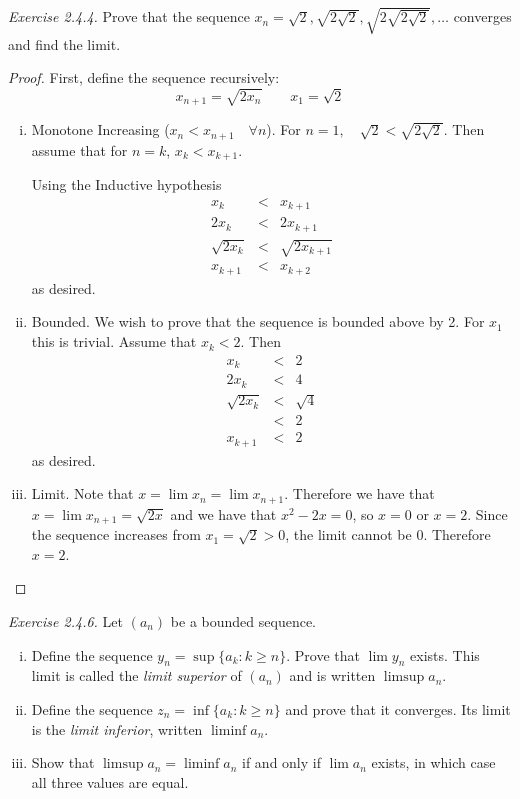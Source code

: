 \emph{Exercise 2.4.4.}  Prove that the sequence $x_n = \sqrt{2}, \sqrt{2\sqrt{2}}, \sqrt{2\sqrt{2\sqrt{2}}}, \ldots$
	converges and find the limit.
	
	\begin{proof}
	First, define the sequence recursively:
	$$  x_{n+1} = \sqrt{2 x_n} \qquad x_1 = \sqrt{2} $$
		\begin{enumerate}[(i)]
		
			\item Monotone Increasing  ($x_{n} < x_{n+1}\quad \forall n$).  For $n=1, \quad \sqrt{2} < \sqrt{2\sqrt{2}}$. Then assume that for $n=k$, $x_k < x_{k+1}$.
			
			Using the Inductive hypothesis
			\begin{eqnarray*}
x_{k}  & <& x_{k+1} \\
   	2x_{k}  &<& 2x_{k+1} \\
    \sqrt{2x_{k}}  &<&\sqrt{ 2 x_{k+1}}\\
    x_{k+1}  & <& x_{k+2}
\end{eqnarray*} as desired.

\item Bounded.  We wish to prove that the sequence is bounded above by 2.
For $x_1$ this is trivial.  Assume that $x_k < 2$.
Then 
\begin{eqnarray*}
x_{k}  & <& 2 \\
   	2x_{k}  &<& 4 \\
    \sqrt{2x_{k}}  &<&\sqrt{ 4}\\
 & <& 2 \\
 x_{k+1}  & <& 2
\end{eqnarray*} as desired.   


\item Limit.  Note that $x = \lim x_n = \lim x_{n+1}$.  Therefore we have that $x = \lim x_{n+1} = \sqrt{2x}$ and we have that $x^2 - 2x = 0$, so $x = 0$ or $x = 2$.  Since the sequence increases from $x_1 = \sqrt{2} > 0$, the limit cannot be $0$.  Therefore $x = 2$.
		\end{enumerate}
	\end{proof}
	
	\emph{Exercise 2.4.6.} Let $(a_n)$ be a bounded sequence.
	
	\begin{enumerate}[(i)]
	\item Define the sequence $y_n = \sup \{a_k : k \geq n\}$.  Prove that $\lim y_n$ exists.  This limit is called the \emph{limit superior} of $(a_n)$ and is written $\limsup a_n$.
	\item Define the sequence $z_n = \inf \{a_k : k \geq n\}$ and prove that it converges.  Its limit is the \emph{limit inferior}, written $\liminf a_n$.
	\item Show that $\limsup a_n = \liminf a_n$ if and only if $\lim a_n$ exists, in which case all three values are equal.
	\end{enumerate} %


